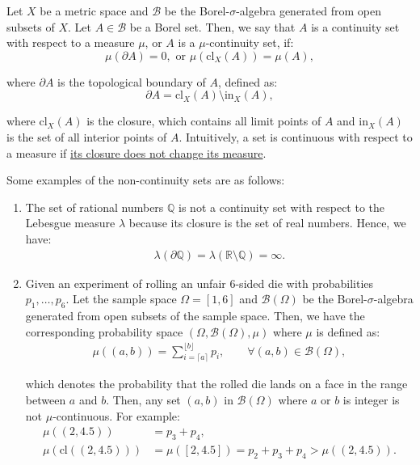 \begin{definition} 
    Let $X$ be a metric space and $\mathcal{B}$ be the Borel-$\sigma$-algebra generated from open subsets of $X$. Let $A\in \mathcal{B}$ be a Borel set. Then, we say that $A$ is a continuity set with respect to a measure $\mu$, or $A$ is a $\mu$-continuity set, if:
    \begin{equation}
        \mu(\partial A) = 0, \text{ or } \mu(\mathrm{cl}_X(A)) = \mu(A),
    \end{equation} 

    \noindent where $\partial A$ is the topological boundary of $A$, defined as:
    \begin{equation}
        \partial A = \mathrm{cl}_X(A) \setminus \mathrm{in}_X(A),
    \end{equation} 

    \noindent where $\mathrm{cl}_X(A)$ is the closure, which contains all limit points of $A$ and $\mathrm{in}_X(A)$ is the set of all interior points of $A$. Intuitively, a set is continuous with respect to a measure if \underline{its closure does not change its measure}.
\end{definition} 

\begin{remark}
    Some examples of the non-continuity sets are as follows:
    \begin{enumerate}
        \item The set of rational numbers $\mathbb{Q}$ is not a continuity set with respect to the Lebesgue measure $\lambda$ because its closure is the set of real numbers. Hence, we have:
        \begin{align*}
            \lambda(\partial \mathbb{Q}) = \lambda(\mathbb{R}\setminus\mathbb{Q}) = \infty. 
        \end{align*}

        \item Given an experiment of rolling an unfair $6$-sided die with probabilities $p_1, \dots, p_6$. Let the sample space $\Omega=[1,6]$ and $\mathcal{B}(\Omega)$ be the Borel-$\sigma$-algebra generated from open subsets of the sample space. Then, we have the corresponding probability space $(\Omega, \mathcal{B}(\Omega), \mu)$ where $\mu$ is defined as:
        \begin{align*}
            \mu((a, b)) = \sum_{i=\lceil a \rceil}^{\lfloor b \rfloor} p_i, \qquad \forall (a, b)\in\mathcal{B}(\Omega),
        \end{align*} 

        \noindent which denotes the probability that the rolled die lands on a face in the range between $a$ and $b$. Then, any set $(a, b)$ in $\mathcal{B}(\Omega)$ where $a$ or $b$ is integer is not $\mu$-continuous. For example:
        \begin{align*}
            \mu((2, 4.5)) &= p_3 + p_4, \\
            \mu(\mathrm{cl}((2, 4.5))) &= \mu([2, 4.5]) = p_2 + p_3 + p_4 > \mu((2, 4.5)). 
        \end{align*} 
    \end{enumerate}  
\end{remark} 


